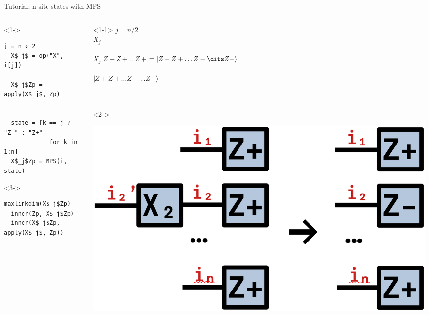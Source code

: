 \begin{frame}[fragile]{Tutorial: n-site states with MPS}

\begin{columns}

\begin{column}{6cm}

\begin{onlyenv}<1->
\begin{lstlisting}[language=JuliaLocal, style=julia, mathescape, basicstyle=\small]
  j = n ÷ 2
  X$_j$ = op("X", i[j])

  X$_j$Zp = apply(X$_j$, Zp)


  state = [k == j ? "Z-" : "Z+"
             for k in 1:n]
  X$_j$Zp = MPS(i, state)
\end{lstlisting}
\end{onlyenv}

\begin{onlyenv}<3->
\begin{lstlisting}[language=JuliaLocal, style=julia, mathescape, basicstyle=\small]
  maxlinkdim(X$_j$Zp)
  inner(Zp, X$_j$Zp)
  inner(X$_j$Zp, apply(X$_j$, Zp))
\end{lstlisting}
\end{onlyenv}

\end{column}

\begin{column}{4cm}

\begin{onlyenv}<1-1>
$j = n/2$ \\
$X_j$ \\
~\\
$X_j|Z+Z+\dots Z+$\rangle$ = \\
    |Z+Z+\dots Z-\dits Z+\rangle$ \\
~\\
$|Z+Z+\dots Z-\dots Z+\rangle$ \\
~\\
~\\
\end{onlyenv}

\begin{onlyenv}<2->
\vspace*{0.0cm}
\begin{center}
\includegraphics[width=1.0\textwidth]{
  slides/assets/XjZpn.png
}
\end{center}
\vspace*{0.0cm}
\end{onlyenv}


\end{column}
\end{columns}
\end{frame}
